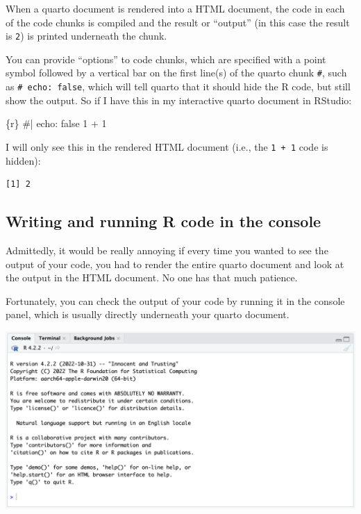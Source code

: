 \documentclass[
  letterpaper,
  DIV=11,
  numbers=noendperiod]{scrreprt}
\newenvironment{Shaded}{\begin{snugshade}}{\end{snugshade}}
\newcommand{\InformationTok}[1]{\textcolor[rgb]{0.37,0.37,0.37}{#1}}
\begin{document}
When a quarto document is rendered into a HTML document, the code in
each of the code chunks is compiled and the result or ``output'' (in
this case the result is \texttt{2}) is printed underneath the chunk.

You can provide ``options'' to code chunks, which are specified with a
point symbol followed by a vertical bar on the first line(s) of the
quarto chunk \texttt{\#\textbar{}}, such as
\texttt{\#\textbar{}\ echo:\ false}, which will tell quarto that it
should hide the R code, but still show the output. So if I have this in
my interactive quarto document in RStudio:

\begin{Shaded}
\begin{Highlighting}[]
\InformationTok{\textasciigrave{}\textasciigrave{}\textasciigrave{}\{r\}}
\InformationTok{\#| echo: false}
\InformationTok{1 + 1}
\InformationTok{\textasciigrave{}\textasciigrave{}\textasciigrave{}}
\end{Highlighting}
\end{Shaded}

I will only see this in the rendered HTML document (i.e., the
\texttt{1\ +\ 1} code is hidden):

\begin{verbatim}
[1] 2
\end{verbatim}

\subsection{Writing and running R code in the
console}\label{writing-and-running-r-code-in-the-console}

Admittedly, it would be really annoying if every time you wanted to see
the output of your code, you had to render the entire quarto document
and look at the output in the HTML document. No one has that much
patience.

Fortunately, you can check the output of your code by running it in the
console panel, which is usually directly underneath your quarto
document.

\includegraphics[width=13.72in,height=\textheight]{figures/console.png}
\end{document}
